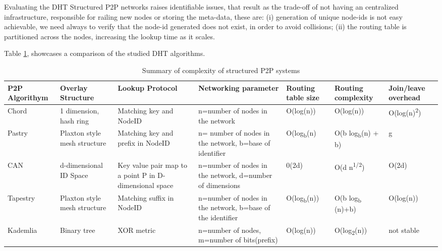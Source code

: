 Evaluating the DHT Structured P2P networks raises identifiable issues, that result as the trade-off of not having an centralized infrastructure, responsible for railing new nodes or storing the meta-data, these are: (i) generation of unique node-ids is not easy achievable, we need always to verify that the node-id generated does not exist, in order to avoid collisions; (ii) the routing table is partitioned across the nodes, increasing the lookup time as it scales.

Table \ref{table:p2pdht}, showcases a comparison of the studied DHT algorithms.


\begin{table}[h!]
    \begin{center}

        \begin{tabular}{| p{1.3cm} | p{2.0cm} | p{2.9cm} | p{3.2cm} | p{1.6cm} | p{1.8cm} | p{1.8cm} |}
        \hline
        \bf{P2P Algorithym} & 
        \bf{Overlay Structure} & 
        \bf{Lookup Protocol} & 
        \bf{Networking parameter} & 
        \bf{Routing table size} & 
        \bf{Routing complexity} & 
        \bf{Join/leave overhead} \\ \hline

        Chord & 
        1 dimension, hash ring & 
        Matching key and NodeID & 
        n=number of nodes in the network & 
        O(log(n)) & 
        O(log(n)) & 
        O(log(n)\textsuperscript{2}) \\ \hline

        Pastry & 
        Plaxton style mesh structure & 
        Matching key and prefix in NodeID & 
        n= number of nodes in the network, b=base of identifier & 
        O(log\textsubscript{b}(n) & 
        O(b log\textsubscript{b}(n) + b) & 
        g \\ \hline

        CAN & 
        d-dimensional ID Space & 
        Key value pair map to a point P in D-dimensional space & 
        n=number of nodes in the network, d=number of dimensions & 
        0(2d) & 
        O(d n\textsuperscript{1/2}) & 
        O(2d) \\ \hline

        Tapestry & 
        Plaxton style mesh structure & 
        Matching suffix in NodeID & 
        n=number of nodes in the network, b=base of the identifier & 
        O(log\textsubscript{b}(n)) & 
        O(b log\textsubscript{b} (n)+b) & 
        O(log(n)) \\ \hline

        Kademlia & 
        Binary tree & 
        XOR metric & 
        n=number of nodes, m=number of bits(prefix) & 
        O(log(n)) & 
        O(log\textsubscript{2}(n)) & 
        not stable \\ \hline

        \end{tabular}
    \end{center}
\caption{Summary of complexity of structured P2P systems}
\label{table:p2pdht}
\end{table}	


